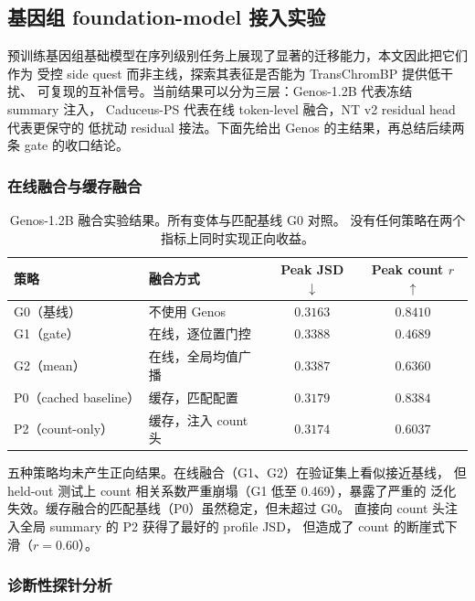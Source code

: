 \documentclass[11pt,a4paper]{ctexart}
\begin{document}
\subsection{基因组 foundation-model 接入实验}
\label{sec:genos}

预训练基因组基础模型在序列级别任务上展现了显著的迁移能力，本文因此把它们作为
受控 side quest 而非主线，探索其表征是否能为 TransChromBP 提供低干扰、
可复现的互补信号。当前结果可以分为三层：Genos-1.2B 代表冻结 summary 注入，
Caduceus-PS 代表在线 token-level 融合，NT v2 residual head 代表更保守的
低扰动 residual 接法。下面先给出 Genos 的主结果，再总结后续两条 gate 的收口结论。

\subsubsection{在线融合与缓存融合}

\begin{table}[H]
\centering
\caption{Genos-1.2B 融合实验结果。所有变体与匹配基线 G0 对照。
没有任何策略在两个指标上同时实现正向收益。}
\label{tab:genos}
\begin{tabular}{llcc}
\toprule
策略 & 融合方式 & Peak JSD $\downarrow$ & Peak count $r$ $\uparrow$ \\
\midrule
G0（基线） & 不使用 Genos & $0.3163$ & $\mathbf{0.8410}$ \\
\midrule
G1（gate） & 在线，逐位置门控 & $0.3388$ & $0.4689$ \\
G2（mean） & 在线，全局均值广播 & $0.3387$ & $0.6360$ \\
P0（cached baseline） & 缓存，匹配配置 & $0.3179$ & $0.8384$ \\
P2（count-only） & 缓存，注入 count 头 & $\mathbf{0.3174}$ & $0.6037$ \\
\bottomrule
\end{tabular}
\end{table}

五种策略均未产生正向结果。在线融合（G1、G2）在验证集上看似接近基线，
但 held-out 测试上 count 相关系数严重崩塌（G1 低至 0.469），暴露了严重的
泛化失效。缓存融合的匹配基线（P0）虽然稳定，但未超过 G0。
直接向 count 头注入全局 summary 的 P2 获得了最好的 profile JSD，
但造成了 count 的断崖式下滑（$r = 0.60$）。

\subsubsection{诊断性探针分析}
\end{document}
